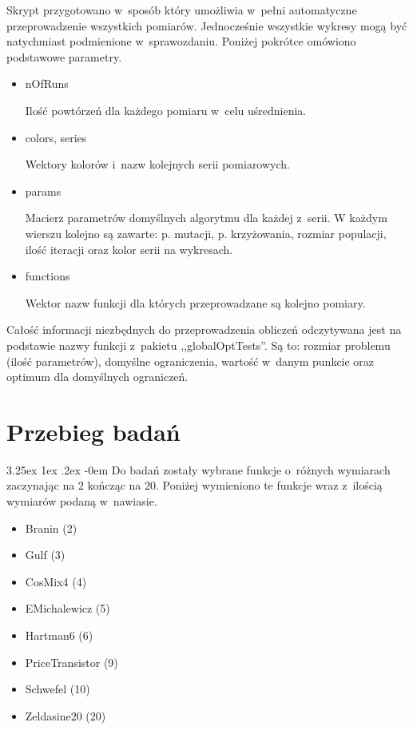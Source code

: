 \documentclass[11pt, a4paper]{article}
\makeatletter
\newcommand{\fbi}{\leavevmode{\parindent=1em\indent}}
\renewcommand\paragraph{\@startsection{paragraph}{5}{\z@}
  {3.25ex \@plus1ex \@minus.2ex}
  {-0em}
  {\normalfont\normalsize\bfseries}}
\makeatother
\begin{document}
\fbi
Skrypt przygotowano w~sposób który umożliwia w~pełni automatyczne przeprowadzenie wszystkich pomiarów. Jednocześnie wszystkie wykresy mogą być natychmiast podmienione w~sprawozdaniu. Poniżej pokrótce omówiono podstawowe parametry.

\begin{itemize}
	\item nOfRuns
	
	Ilość powtórzeń dla każdego pomiaru w~celu uśrednienia.
	
	\item colors, series
	
	Wektory kolorów i~nazw kolejnych serii pomiarowych. 
	
	\item params
	
	Macierz parametrów domyślnych algorytmu dla każdej z~serii. W każdym wierszu kolejno są zawarte: p. mutacji, p. krzyżowania, rozmiar populacji, ilość iteracji oraz kolor serii na wykresach.
	
	\item functions
	
	Wektor nazw funkcji dla których przeprowadzane są kolejno pomiary.
	
\end{itemize}

Całość informacji niezbędnych do przeprowadzenia obliczeń odczytywana jest na podstawie nazwy funkcji z~pakietu ,,globalOptTests''. Są to: rozmiar problemu (ilość parametrów), domyślne ograniczenia, wartość w~danym punkcie oraz optimum dla domyślnych ograniczeń.

\newpage
\section{Przebieg badań}
\paragraph{}
Do badań zostały wybrane funkcje o~różnych wymiarach zaczynając na 2 kończąc na 20. Poniżej wymieniono te funkcje wraz z~ilością wymiarów podaną w~nawiasie.

\begin{itemize}
	\item Branin (2)
	\item Gulf (3)
	\item CosMix4 (4)
	\item EMichalewicz (5)
	\item Hartman6 (6)
	\item PriceTransistor (9)
	\item Schwefel (10)
	\item Zeldasine20 (20)
\end{itemize}
\end{document}
